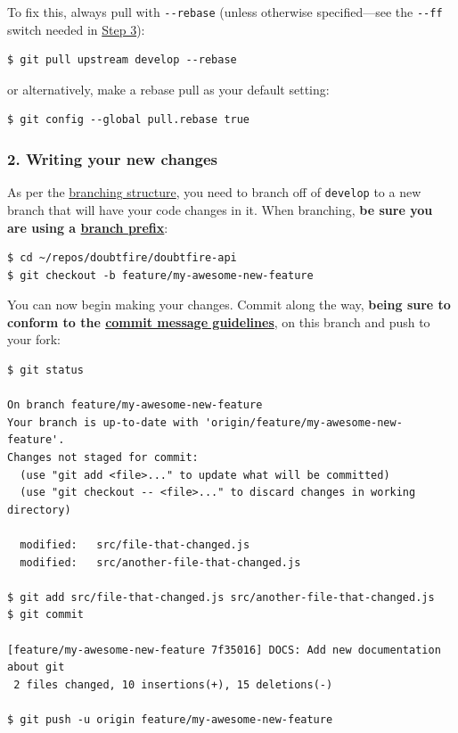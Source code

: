 \documentclass[12pt,a4paper,]{article}
\begin{document}
To fix this, always pull with \texttt{-\/-rebase} (unless otherwise
specified---see the \texttt{-\/-ff} switch needed in
\protect\hyperlink{3-prepare-for-a-pull-request}{Step 3}):

\begin{verbatim}
$ git pull upstream develop --rebase
\end{verbatim}

or alternatively, make a rebase pull as your default setting:

\begin{verbatim}
$ git config --global pull.rebase true
\end{verbatim}

\subsubsection{2. Writing your new
changes}\label{writing-your-new-changes}

As per the
\protect\hyperlink{about-the-doubtfire-branch-structure}{branching
structure}, you need to branch off of \texttt{develop} to a new branch
that will have your code changes in it. When branching, \textbf{be sure
you are using a \protect\hyperlink{branch-prefixes}{branch prefix}}:

\begin{verbatim}
$ cd ~/repos/doubtfire/doubtfire-api
$ git checkout -b feature/my-awesome-new-feature
\end{verbatim}

You can now begin making your changes. Commit along the way,
\textbf{being sure to conform to the
\protect\hyperlink{writing-commit-messages}{commit message guidelines}},
on this branch and push to your fork:

\begin{verbatim}
$ git status

On branch feature/my-awesome-new-feature
Your branch is up-to-date with 'origin/feature/my-awesome-new-feature'.
Changes not staged for commit:
  (use "git add <file>..." to update what will be committed)
  (use "git checkout -- <file>..." to discard changes in working directory)

  modified:   src/file-that-changed.js
  modified:   src/another-file-that-changed.js

$ git add src/file-that-changed.js src/another-file-that-changed.js
$ git commit

[feature/my-awesome-new-feature 7f35016] DOCS: Add new documentation about git
 2 files changed, 10 insertions(+), 15 deletions(-)

$ git push -u origin feature/my-awesome-new-feature
\end{verbatim}
\end{document}

